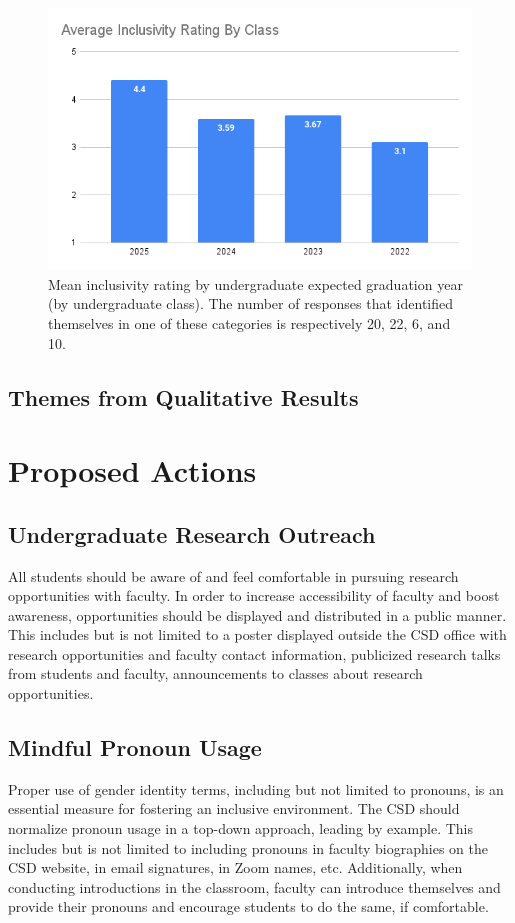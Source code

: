 \documentclass{article}
\begin{document}
\begin{figure}[h]
\label{class}
\includegraphics[width=\textwidth]{class.png}
\caption{Mean inclusivity rating by undergraduate expected graduation year (by undergraduate class).
The number of responses that identified themselves in 
one of these categories is respectively 20, 22, 6, and 10.}
\end{figure}

\subsection{Themes from Qualitative Results}


\section{Proposed Actions}\label{proposed actions}


\subsection{Undergraduate Research Outreach} 
All students should be aware of and feel comfortable in pursuing 
research opportunities with faculty. In order to increase accessibility of faculty and boost awareness, 
opportunities should be displayed and distributed in a public manner. This includes but is not limited to a poster 
displayed outside the CSD office with research opportunities and faculty contact information, publicized research 
talks from students and faculty, announcements to classes about research opportunities.

\subsection{Mindful Pronoun Usage} 
Proper use of gender identity terms, including but not limited to pronouns, 
is an essential measure for fostering an inclusive environment. The CSD should normalize pronoun usage in a 
top-down approach, leading by example. This includes but is not limited to including pronouns in faculty biographies 
on the CSD website, in email signatures, in Zoom names, etc. Additionally, when conducting introductions in the 
classroom, faculty can introduce themselves and provide their pronouns and encourage students to do the same, if 
comfortable.
\end{document}
